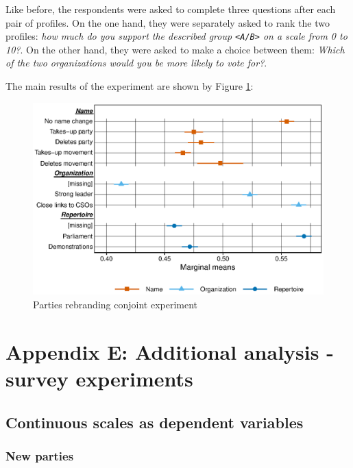 \documentclass[12pt]{article}
\begin{document}
Like before, the respondents were asked to complete three questions after each pair of profiles. On the one hand, they were separately asked to rank the two profiles: \textit{how much do you support the described group \texttt{<A/B>} on a scale from 0 to 10?}. On the other hand, they were asked to make a choice between them: \textit{Which of the two organizations would you be more likely to vote for?}.

The main results of the experiment are shown by Figure \ref{conjoint2_main}:

\begin{figure}[H]
\includegraphics[width=\textwidth]{./Figures/CJ2_main_tradeoff.eps}
\caption{Parties rebranding conjoint experiment}
\label{conjoint2_main}
\end{figure}

\newpage 

\section{Appendix E: Additional analysis - survey experiments}

\setcounter{figure}{0}
\setcounter{table}{0}

\subsection{Continuous scales as dependent variables}

\subsubsection{New parties}
\end{document}
